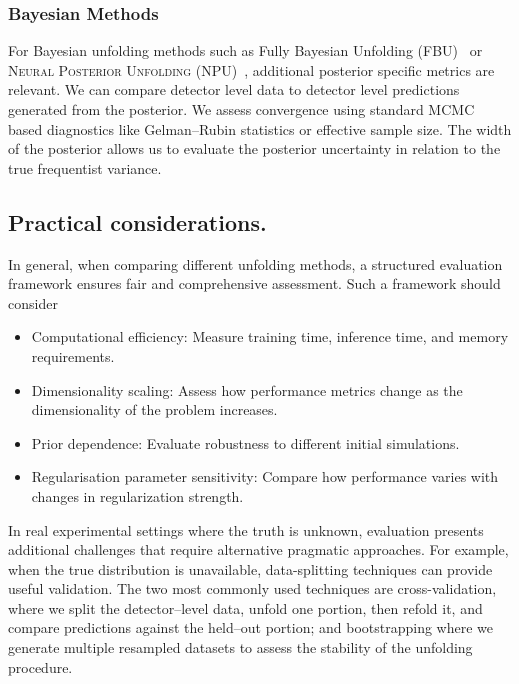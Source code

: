         \subsubsection{Bayesian Methods}
            For Bayesian unfolding methods such as Fully Bayesian Unfolding (FBU)~\cite{choudalakis_fully_2012} or \textsc{Neural Posterior Unfolding} (NPU)~\cite{acosta2024npu}, additional posterior specific metrics are relevant.
            We can compare detector level data to detector level predictions generated from the posterior.
            We assess convergence using standard MCMC based diagnostics like Gelman--Rubin statistics or effective sample size.
            The width of the posterior allows us to evaluate the posterior uncertainty in relation to the true frequentist variance.

    \subsection{Practical considerations.}
        In general, when comparing different unfolding methods, a structured evaluation framework ensures fair and comprehensive assessment. Such a framework should consider
        \begin{itemize}
            \item Computational efficiency: Measure training time, inference time, and memory requirements.
            \item Dimensionality scaling: Assess how performance metrics change as the dimensionality of the problem increases.
            \item Prior dependence: Evaluate robustness to different initial simulations.
            \item Regularisation parameter sensitivity: Compare how performance varies with changes in regularization strength.
        \end{itemize}

        In real experimental settings where the truth is unknown, evaluation presents additional challenges that require alternative pragmatic approaches.
        For example, when the true distribution is unavailable, data-splitting techniques can provide useful validation.
        The two most commonly used techniques are cross-validation, where we split the detector--level data, unfold one portion, then refold it, and compare predictions against the held--out portion; and bootstrapping where we generate multiple resampled datasets to assess the stability of the unfolding procedure.

